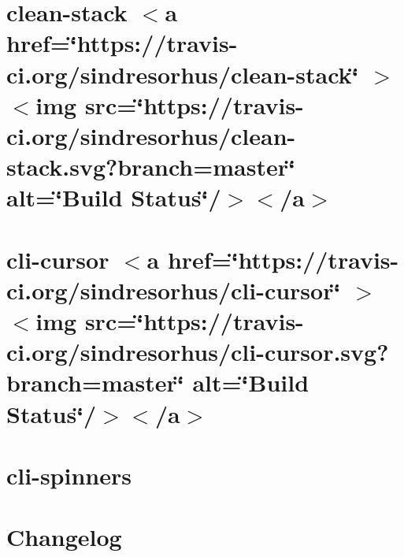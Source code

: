 \documentclass[twoside]{book}
\newcommand{\+}{\discretionary{\mbox{\scriptsize$\hookleftarrow$}}{}{}}
\begin{document}
\chapter{clean-\/stack \texorpdfstring{$<$}{<}a href=\char`\"{}https\+://travis-\/ci.\+org/sindresorhus/clean-\/stack\char`\"{} \texorpdfstring{$>$}{>}\texorpdfstring{$<$}{<}img src=\char`\"{}https\+://travis-\/ci.\+org/sindresorhus/clean-\/stack.\+svg?branch=master\char`\"{} alt=\char`\"{}\+Build Status\char`\"{}/\texorpdfstring{$>$}{>}\texorpdfstring{$<$}{<}/a\texorpdfstring{$>$}{>}}
\label{md__c___users_vaishnavi_jadhav__desktop__developer_code_mean_stack_example_client_node_modules_clean_stack_readme}

\chapter{cli-\/cursor \texorpdfstring{$<$}{<}a href=\char`\"{}https\+://travis-\/ci.\+org/sindresorhus/cli-\/cursor\char`\"{} \texorpdfstring{$>$}{>}\texorpdfstring{$<$}{<}img src=\char`\"{}https\+://travis-\/ci.\+org/sindresorhus/cli-\/cursor.\+svg?branch=master\char`\"{} alt=\char`\"{}\+Build Status\char`\"{}/\texorpdfstring{$>$}{>}\texorpdfstring{$<$}{<}/a\texorpdfstring{$>$}{>}}
\label{md__c___users_vaishnavi_jadhav__desktop__developer_code_mean_stack_example_client_node_modules_cli_cursor_readme}

\chapter{cli-\/spinners}
\label{md__c___users_vaishnavi_jadhav__desktop__developer_code_mean_stack_example_client_node_modules_cli_spinners_readme}

\chapter{Changelog}
\label{md__c___users_vaishnavi_jadhav__desktop__developer_code_mean_stack_example_client_node_modules_cli_width__c_h_a_n_g_e_l_o_g}

\end{document}
